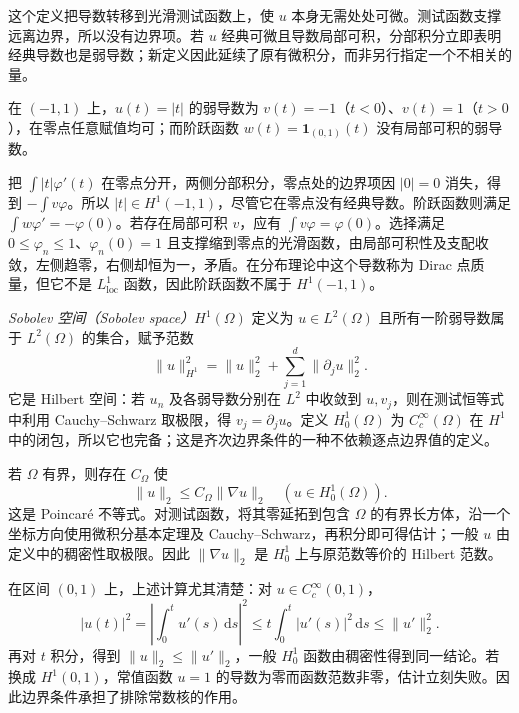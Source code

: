 这个定义把导数转移到光滑测试函数上，使 $u$ 本身无需处处可微。测试函数支撑远离边界，所以没有边界项。若 $u$ 经典可微且导数局部可积，分部积分立即表明经典导数也是弱导数；新定义因此延续了原有微积分，而非另行指定一个不相关的量。

\begin{example}
在 $(-1,1)$ 上，$u(t)=|t|$ 的弱导数为 $v(t)=-1$（$t<0$）、$v(t)=1$（$t>0$），在零点任意赋值均可；而阶跃函数 $w(t)=\mathbf1_{(0,1)}(t)$ 没有局部可积的弱导数。
\end{example}
\begin{solve}
把 $\int |t|\varphi'(t)$ 在零点分开，两侧分部积分，零点处的边界项因 $|0|=0$ 消失，得到 $-\int v\varphi$。所以 $|t|\in H^1(-1,1)$，尽管它在零点没有经典导数。阶跃函数则满足 $\int w\varphi'=-\varphi(0)$。若存在局部可积 $v$，应有 $\int v\varphi=\varphi(0)$。选择满足 $0\leq\varphi_n\leq1$、$\varphi_n(0)=1$ 且支撑缩到零点的光滑函数，由局部可积性及支配收敛，左侧趋零，右侧却恒为一，矛盾。在分布理论中这个导数称为 Dirac 点质量，但它不是 $L^1_{\mathrm{loc}}$ 函数，因此阶跃函数不属于 $H^1(-1,1)$。
\end{solve}

\emph{Sobolev 空间（Sobolev space）}$H^1(\Omega)$ 定义为 $u\in L^2(\Omega)$ 且所有一阶弱导数属于 $L^2(\Omega)$ 的集合，赋予范数
\[
 \|u\|_{H^1}^2=\|u\|_2^2+\sum_{j=1}^d\|\partial_ju\|_2^2.
\]
它是 Hilbert 空间：若 $u_n$ 及各弱导数分别在 $L^2$ 中收敛到 $u,v_j$，则在测试恒等式中利用 Cauchy--Schwarz 取极限，得 $v_j=\partial_ju$。定义 $H_0^1(\Omega)$ 为 $C_c^\infty(\Omega)$ 在 $H^1$ 中的闭包，所以它也完备；这是齐次边界条件的一种不依赖逐点边界值的定义。

若 $\Omega$ 有界，则存在 $C_\Omega$ 使
\begin{equation}
 \|u\|_2\leq C_\Omega\|\nabla u\|_2\quad(u\in H_0^1(\Omega)).
 \label{eq:fa-poincare}
\end{equation}
这是 Poincaré 不等式。对测试函数，将其零延拓到包含 $\Omega$ 的有界长方体，沿一个坐标方向使用微积分基本定理及 Cauchy--Schwarz，再积分即可得估计；一般 $u$ 由定义中的稠密性取极限。因此 $\|\nabla u\|_2$ 是 $H_0^1$ 上与原范数等价的 Hilbert 范数。

在区间 $(0,1)$ 上，上述计算尤其清楚：对 $u\in C_c^\infty(0,1)$，
\[
 |u(t)|^2=\left|\int_0^tu'(s)\,\mathrm ds\right|^2
 \leq t\int_0^t|u'(s)|^2\,\mathrm ds\leq\|u'\|_2^2.
\]
再对 $t$ 积分，得到 $\|u\|_2\leq\|u'\|_2$，一般 $H_0^1$ 函数由稠密性得到同一结论。若换成 $H^1(0,1)$，常值函数 $u=1$ 的导数为零而函数范数非零，估计立刻失败。因此边界条件承担了排除常数核的作用。

